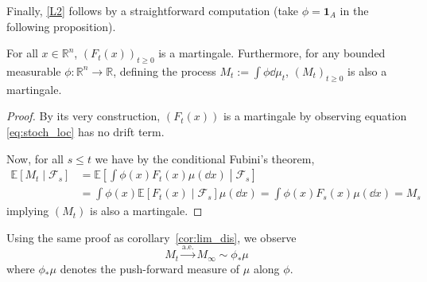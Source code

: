 Finally, \ref{L2} follows by a straightforward computation (take \(\phi = \mathbf{1}_A\) in the following 
proposition).

\begin{proposition}
  For all \(x \in \mathbb{R}^n\), \((F_t(x))_{t \ge 0}\) is a martingale. Furthermore, for any 
  bounded measurable \(\phi : \mathbb{R}^n \to \mathbb{R}\), defining the process 
  \(M_t := \int \phi \dd \mu_t\), \((M_t)_{t \ge 0}\) is also a martingale.
\end{proposition}
\begin{proof}
  By its very construction, \((F_t(x))\) is a martingale by observing equation \ref{eq:stoch_loc} has no 
  drift term.
  
  Now, for all \(s \le t\) we have by the conditional Fubini's theorem,
  \begin{align*}
    \mathbb{E}[M_t \mid \mathscr{F}_s] 
    & = \mathbb{E}\left[\int \phi(x) F_t(x) \mu(\dd x) \middle\vert \mathscr{F}_s\right]\\
    & = \int \phi(x) \mathbb{E}[F_t(x) \mid \mathscr{F}_s] \mu(\dd x) 
    = \int \phi(x) F_s(x) \mu(\dd x)
    = M_s
  \end{align*}
  implying \((M_t)\) is also a martingale.
\end{proof}

Using the same proof as corollary~\ref{cor:lim_dis}, we observe 
\begin{equation}\label{eq:lim_mart}
  M_t \xrightarrow{\text{a.e.}} M_\infty \sim \phi_* \mu
\end{equation}
where \(\phi_*\mu\) denotes the push-forward measure of \(\mu\) along \(\phi\).